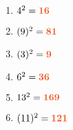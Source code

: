 \documentclass[a4paper,12pt]{report}
\begin{document}
\begin{Correction}
\begin{EXO}{}{}
\end{EXO}

\begin{EXO}{}{}

\begin{enumerate}[itemsep=1.5em]
\item $4^2={\color[HTML]{f15929}\boldsymbol{16}}$
\item $(9)^2={\color[HTML]{f15929}\boldsymbol{81}}$
\item $(3)^2={\color[HTML]{f15929}\boldsymbol{9}}$
\item $6^2={\color[HTML]{f15929}\boldsymbol{36}}$
\item $13^2={\color[HTML]{f15929}\boldsymbol{169}}$
\item $(11)^2={\color[HTML]{f15929}\boldsymbol{121}}$
\end{enumerate}

\end{EXO}

\begin{EXO}{}{}


\end{EXO}
\end{Correction}
\end{document}
